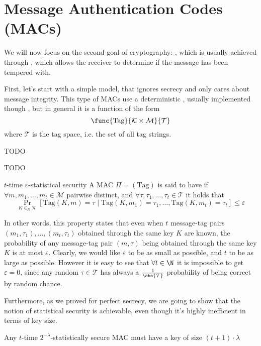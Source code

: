 \documentclass[a4paper, 12pt]{report}
\begin{document}
\section{Message Authentication Codes (MACs)}

We will now focus on the second goal of cryptography: , which is usually achieved through , which allows the receiver to determine if the message has been tempered with.

First, let's start with a simple model, that ignores secrecy and only cares about message integrity. This type of MACs use a deterministic , usually implemented though , but in general it is a function of the form $$\func{\mbox{Tag}}{\mathcal K \times \mathcal M}{\mathcal T}$$ where $\mathcal T$ is the tag space, i.e. the set of all tag strings.

TODO 

TODO 

\begin{frameddefn}{$t$-time $\varepsilon$-statistical security}
	A MAC $\Pi = (\mbox{Tag})$ is said to have  if $\forall m, m_1, \ldots, m_t \in \mathcal M$ pairwise distinct, and $\forall \tau, \tau_1, \ldots, \tau_t \in \mathcal T$ it holds that $$\Pr_{K \in_R \mathcal K}[\mbox{Tag}(K, m) = \tau \mid \mbox{Tag}(K, m_1) = \tau_1, \ldots, \mbox{Tag}(K, m_t) = \tau_t] \le \varepsilon$$
\end{frameddefn}

In other words, this property states that even when $t$ message-tag pairs $(m_1, \tau_1), \ldots, (m_t, \tau_t)$ obtained through the same key $K$ are known, the probability of any message-tag pair $(m, \tau)$ being obtained through the same key $K$ is at most $\varepsilon$. Clearly, we would like $\varepsilon$ to be as small as possible, and $t$ to be as large as possible. However it is easy to see that $\forall t \in \N$ it is impossible to get $\varepsilon = 0$, since any random $\tau \in \mathcal T$ has always a $\tfrac{1}{\abs {\mathcal T}}$ probability of being correct by random chance.

Furthermore, as we proved for perfect secrecy, we are going to show that the notion of  statistical security is achievable, even though it's highly inefficient in terms of key size.

\begin{framedthm}{}
	Any $t$-time $2^{-\lambda}$-statistically secure MAC must have a key of size $(t + 1) \cdot \lambda$
\end{framedthm}
\end{document}
